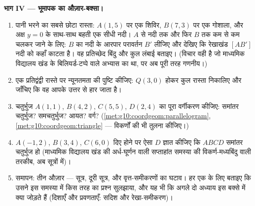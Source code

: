 \begin{problem}
\medskip
\noindent\textbf{भाग IV --- भूमापक का औज़ार-बक्सा।}
\begin{enumerate}[resume]
  \item पानी भरने का सबसे छोटा रास्ता: $A(1, 5)$ पर एक शिविर, $B(7, 3)$ पर एक
        गोशाला, और अक्ष $y = 0$ के साथ-साथ बहती एक सीधी नदी। $A$ से नदी
        तक और फिर $B$ तक कम से कम चलकर जाने के लिए: $B$ का नदी के
        आरपार परावर्तन $B'$ लीजिए और देखिए कि रेखाखंड $[AB']$ नदी को कहाँ
        काटता है। वह प्रतिच्छेद बिंदु और  कुल लंबाई बताइए।
        (विचार वही है जो माध्यमिक विद्यालय खंड के बिलियर्ड-टप्पे वाले
        अभ्यास का था, पर अब पूरी तरह गणनीय।)
  \item एक प्रतिद्वंद्वी रास्ते पर न्यूनतमता की पुष्टि कीजिए: $Q(3, 0)$ होकर
        कुल रास्ता निकालिए और जाँचिए कि वह आपके उत्तर से हार जाता है।
  \item चतुर्भुज $A(1,1)$, $B(4,2)$, $C(5,5)$, $D(2,4)$ का पूरा वर्गीकरण कीजिए:
        समांतर चतुर्भुज? समचतुर्भुज? आयत? वर्ग? (\cref{met:g10:coordgeom:parallelogram}, \cref{met:g10:coordgeom:triangle} --- विकर्णों
        की भी तुलना कीजिए।)
  \item $A(-1, 2)$, $B(3, 4)$, $C(6, 0)$ दिए होने पर ऐसा $D$ ज्ञात कीजिए कि $ABCD$
        समांतर चतुर्भुज हो (माध्यमिक विद्यालय खंड की अर्ध-घूर्णन वाली
        सप्ताहांत समस्या की विकर्ण-मध्यबिंदु वाली तरकीब, अब सूत्रों में)।
  \item समापन: तीन औज़ार ---  सूत्र, दूरी सूत्र, और वृत्त-समीकरणों
        का घटाव। हर एक के लिए बताइए कि उसने इस समस्या में किस तरह का
        प्रश्न सुलझाया, और यह भी कि अगले दो अध्याय इस बक्से में क्या
        जोड़ते हैं (दिशाएँ और प्रवणताएँ: सदिश और रेखा-समीकरण)।
\end{enumerate}
\end{problem}
